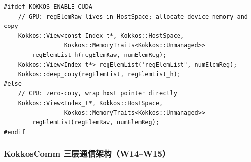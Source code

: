 \documentclass[UTF8,12pt,a4paper]{ctexart}
\begin{document}
\begin{lstlisting}[caption={EvalEOSForElems 双路径 GPU 修复（src/lulesh-eos.cc）},
                   label={lst:gpufix}]
#ifdef KOKKOS_ENABLE_CUDA
    // GPU: regElemRaw lives in HostSpace; allocate device memory and copy
    Kokkos::View<const Index_t*, Kokkos::HostSpace,
                 Kokkos::MemoryTraits<Kokkos::Unmanaged>>
        regElemList_h(regElemRaw, numElemReg);
    Kokkos::View<Index_t*> regElemList("regElemList", numElemReg);
    Kokkos::deep_copy(regElemList, regElemList_h);
#else
    // CPU: zero-copy, wrap host pointer directly
    Kokkos::View<Index_t*, Kokkos::HostSpace,
                 Kokkos::MemoryTraits<Kokkos::Unmanaged>>
        regElemList(regElemRaw, numElemReg);
#endif
\end{lstlisting}

\subsubsection{KokkosComm 三层通信架构（W14--W15）}
\end{document}
